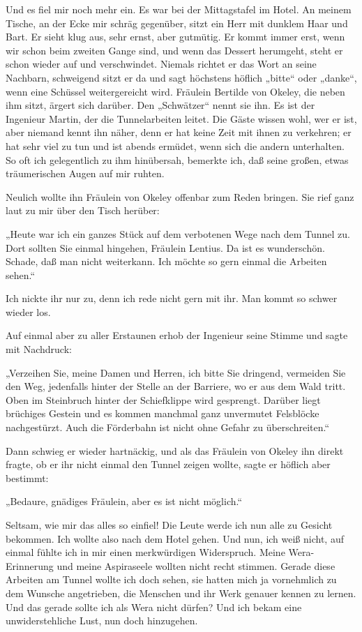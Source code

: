 Und es fiel mir noch mehr ein. Es war bei der Mittagstafel im
Hotel. An meinem Tische, an der Ecke mir schräg gegenüber, sitzt
ein Herr mit dunklem Haar und Bart. Er sieht klug aus, sehr ernst,
aber gutmütig. Er kommt immer erst, wenn wir schon beim zweiten
Gange sind, und wenn das Dessert herumgeht, steht er schon wieder
auf und verschwindet. Niemals richtet er das Wort an seine
Nachbarn, schweigend sitzt er da und sagt höchstens höflich „bitte“
oder „danke“, wenn eine Schüssel weitergereicht wird. Fräulein
Bertilde von Okeley, die neben ihm sitzt, ärgert sich darüber. Den
„Schwätzer“ nennt sie ihn. Es ist der Ingenieur Martin, der die
Tunnelarbeiten leitet. Die Gäste wissen wohl, wer er ist, aber
niemand kennt ihn näher, denn er hat keine Zeit mit ihnen zu
verkehren; er hat sehr viel zu tun und ist abends ermüdet, wenn
sich die andern unterhalten. So oft ich gelegentlich zu ihm
hinübersah, bemerkte ich, daß seine großen, etwas träumerischen
Augen auf mir ruhten.

Neulich wollte ihn Fräulein von Okeley offenbar zum Reden bringen.
Sie rief ganz laut zu mir über den Tisch herüber:

„Heute war ich ein ganzes Stück auf dem verbotenen Wege nach dem
Tunnel zu. Dort sollten Sie einmal hingehen, Fräulein Lentius. Da
ist es wunderschön. Schade, daß man nicht weiterkann. Ich möchte so
gern einmal die Arbeiten sehen.“

Ich nickte ihr nur zu, denn ich rede nicht gern mit ihr. Man kommt
so schwer wieder los.

Auf einmal aber zu aller Erstaunen erhob der Ingenieur seine Stimme
und sagte mit Nachdruck:

„Verzeihen Sie, meine Damen und Herren, ich bitte Sie dringend,
vermeiden Sie den Weg, jedenfalls hinter der Stelle an der
Barriere, wo er aus dem Wald tritt. Oben im Steinbruch hinter der
Schiefklippe wird gesprengt. Darüber liegt brüchiges Gestein und es
kommen manchmal ganz unvermutet Felsblöcke nachgestürzt. Auch die
Förderbahn ist nicht ohne Gefahr zu überschreiten.“

Dann schwieg er wieder hartnäckig, und als das Fräulein von Okeley
ihn direkt fragte, ob er ihr nicht einmal den Tunnel zeigen wollte,
sagte er höflich aber bestimmt:

„Bedaure, gnädiges Fräulein, aber es ist nicht möglich.“

Seltsam, wie mir das alles so einfiel! Die Leute werde ich nun alle
zu Gesicht bekommen. Ich wollte also nach dem Hotel gehen. Und nun,
ich weiß nicht, auf einmal fühlte ich in mir einen merkwürdigen
Widerspruch. Meine Wera-Erinnerung und meine Aspiraseele wollten
nicht recht stimmen. Gerade diese Arbeiten am Tunnel wollte ich
doch sehen, sie hatten mich ja vornehmlich zu dem Wunsche
angetrieben, die Menschen und ihr Werk genauer kennen zu lernen.
Und das gerade sollte ich als Wera nicht dürfen? Und ich bekam eine
unwiderstehliche Lust, nun doch hinzugehen.

